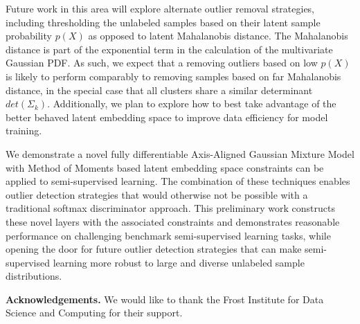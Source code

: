 \documentclass[10pt,twocolumn,letterpaper]{article}
\begin{document}



Future work in this area will explore alternate outlier removal strategies, including thresholding the unlabeled samples based on their latent sample probability $p(X)$ as opposed to latent Mahalanobis distance.  
The Mahalanobis distance is part of the exponential term in the calculation of the multivariate Gaussian PDF. 
As such, we expect that a removing outliers based on low $p(X)$ is likely to perform comparably to removing samples based on far Mahalanobis distance, in the special case that all clusters share a similar determinant $det\left(\Sigma_k \right)$.  
Additionally, we plan to explore how to best take advantage of the better behaved latent embedding space to improve data efficiency for model training. 

We demonstrate a novel fully differentiable Axis-Aligned Gaussian Mixture Model with Method of Moments based latent embedding space constraints can be applied to semi-supervised learning.  
The combination of these techniques enables outlier detection strategies that would otherwise not be possible with a traditional softmax discriminator approach.
This preliminary work constructs these novel layers with the associated constraints and demonstrates reasonable performance on challenging benchmark semi-supervised learning tasks, while opening the door for future outlier detection strategies that can make semi-supervised learning more robust to large and diverse unlabeled sample distributions.

\textbf{Acknowledgements.} We would like to thank the Frost Institute for Data Science and Computing for their support.




{
	\small
	
	
}
\end{document}
